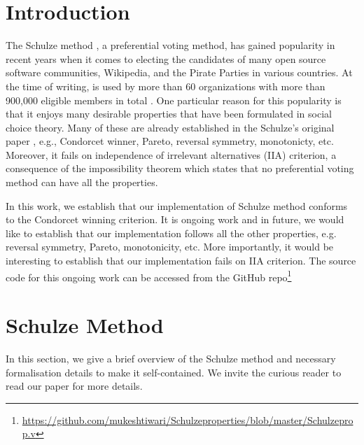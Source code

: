 \documentclass[compsoc,conference,a4paper,10pt,times]{IEEEtran}
\begin{document}
\section{Introduction}
   The Schulze method \cite{Schulze:2011:NMC}, a preferential
    voting method, has gained popularity in recent years
   when it comes to electing the candidates of many open source 
    software communities, Wikipedia, and the Pirate Parties in
    various countries. At the time of writing, 
    is used by more  than  60 organizations  with  more  than  900,000  eligible  
    members  in  total \cite{schulze2020schulze}. One particular reason for this popularity is that it 
    enjoys many desirable properties that have been  formulated in
    social choice theory.
    Many of these are already established in the Schulze's original paper \cite{Schulze:2011:NMC}, e.g., Condorcet winner, Pareto, reversal symmetry, monotonicty, 
    etc. Moreover, it fails on independence of 
    irrelevant alternatives (IIA) criterion, a consequence of the impossibility theorem \cite{arrow1950difficulty} which states that no preferential voting 
    method can have all the properties. 

    In this work, we establish that our implementation of Schulze method \cite{Pattinson:2017:SVE}
    conforms to the Condorcet winning criterion. It is ongoing work and in  
    future, we would like to establish that our implementation follows all the other properties, 
    e.g. reversal symmetry, Pareto, monotonicity, etc. 
    More importantly, it would be interesting to establish that our implementation 
    fails on IIA criterion. The 
    source code for this ongoing work can be accessed from the GitHub 
    repo\footnote{\url{https://github.com/mukeshtiwari/Schulzeproperties/blob/master/Schulzeprop.v}}
    
    \section{Schulze Method}
    In this section, we give a brief overview of the Schulze method and 
    necessary formalisation details to make it self-contained.  We invite the 
    curious reader to read our paper \cite{Pattinson:2017:SVE} for more details. 
    
\end{document}
